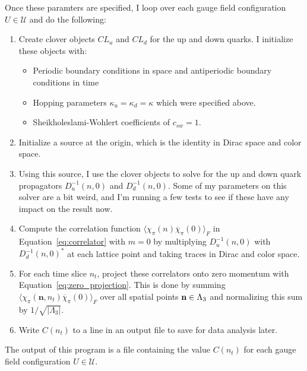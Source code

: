 \documentclass[11pt, oneside]{article}   	%
\theoremstyle{definition}
\begin{document}
Once these paramters are specified, I loop over each gauge field configuration $U\in\mathcal U$ and do the following:
\begin{enumerate}
	\item Create clover objects $CL_u$ and $CL_d$ for the up and down quarks. I initialize these objects with:
	\begin{itemize}
    		\item Periodic boundary conditions in space and antiperiodic boundary conditions in time
		\item Hopping parameters $\kappa_u = \kappa_d = \kappa$ which were specified above. 
		\item Sheikholeslami-Wohlert coefficients of $c_{sw} = 1$. 
	\end{itemize}
	\item Initialize a source at the origin, which is the identity in Dirac space and color space. 
	\item Using this source, I use the clover objects to solve for the up and down quark propagators $D^{-1}_u(n, 0)$ 
	and $D^{-1}_d(n, 0)$. Some of my parameters on this solver are a bit weird, and I'm running a few tests to see if 
	these have any impact on the result now.
	\item Compute the correlation function $\langle\chi_\pi(n)\overline\chi_\pi(0)\rangle_F$ in 
	Equation~\ref{eq:correlator} with $m = 0$ by multiplying $D^{-1}_u(n, 0)$ with $D^{-1}_d(n, 0)^*$ at each lattice 
	point and taking traces in Dirac and color space. 
	\item For each time slice $n_t$, project these correlators onto zero momentum with 
	Equation~\ref{eq:zero_projection}. This is done by summing 
	$\langle\chi_\pi (\mathbf n, n_t)\overline\chi_\pi (0)\rangle_F$ over all spatial points $\textbf n\in\Lambda_3$ and 
	normalizing this sum by $1 / \sqrt{|\Lambda_3|}$. 
	\item Write $C(n_t)$ to a line in an output file to save for data analysis later. 
\end{enumerate}

The output of this program is a file containing the value $C(n_t)$ for each gauge field configuration $U\in\mathcal U$. 
\end{document}
